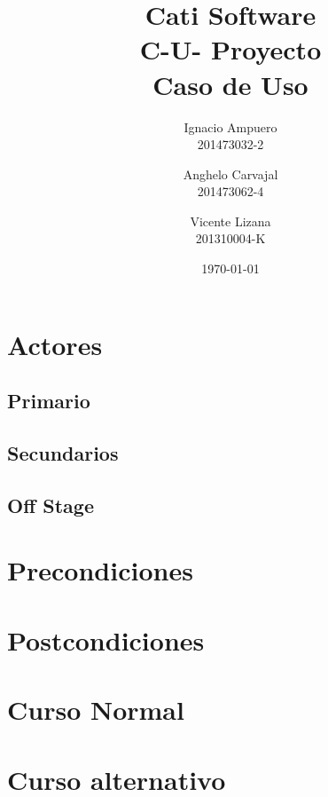 \documentclass[fleqn]{article}
\title{\huge Cati Software\\ \Huge C-U- Proyecto \\ \Large Caso de Uso \vspace{30pt}}
\author{Ignacio Ampuero\\ 201473032-2 \and Anghelo Carvajal\\ 201473062-4 \and Vicente Lizana\\ 201310004-K}
\date{\today}
\begin{document}
\maketitle
\vspace{30pt}

\section{Actores}

	\subsection{Primario}
	
	\subsection{Secundarios}
	
	\subsection{Off Stage}

\section{Precondiciones}

\section{Postcondiciones}

\section{Curso Normal}

\section{Curso alternativo}
\end{document}

